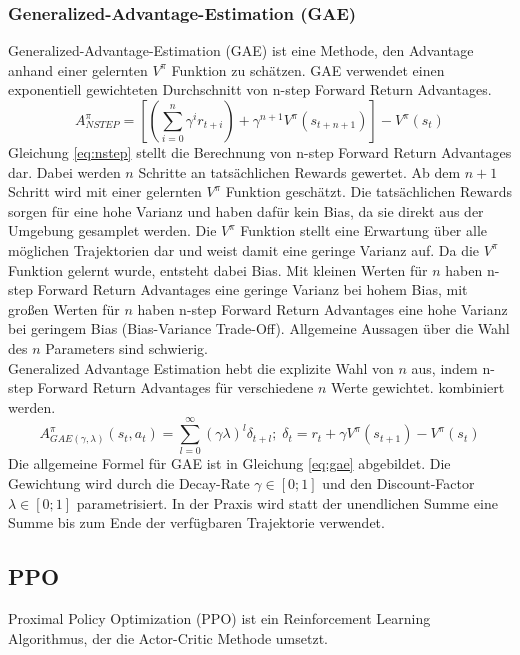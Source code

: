 \subsubsection{Generalized-Advantage-Estimation (GAE)}
Generalized-Advantage-Estimation (GAE) ist eine Methode, den Advantage anhand einer gelernten $V^\pi$ Funktion zu schätzen. GAE verwendet einen exponentiell gewichteten Durchschnitt von n-step Forward Return Advantages.
\begin{equation}
    A^\pi_{NSTEP} = \left[ (\sum_{i=0}^n \gamma^i r_{t+i}) + \gamma^{n+1} V^\pi (s_{t+n+1}) \right] - V^\pi(s_t)
    \label{eq:nstep}
\end{equation}
Gleichung \ref{eq:nstep} stellt die Berechnung von n-step Forward Return Advantages dar. Dabei werden $n$ Schritte an tatsächlichen Rewards gewertet. Ab dem $n+1$ Schritt wird mit einer gelernten $V^\pi$ Funktion geschätzt. Die tatsächlichen Rewards sorgen für eine hohe Varianz und haben dafür kein Bias, da sie direkt aus der Umgebung gesamplet werden. Die $V^\pi$ Funktion stellt eine Erwartung über alle möglichen Trajektorien dar und weist damit eine geringe Varianz auf. Da die $V^\pi$ Funktion gelernt wurde, entsteht dabei Bias. Mit kleinen Werten für $n$ haben n-step Forward Return Advantages eine geringe Varianz bei hohem Bias, mit großen Werten für $n$ haben n-step Forward Return Advantages eine hohe Varianz bei geringem Bias (Bias-Variance Trade-Off). Allgemeine Aussagen über die Wahl des $n$ Parameters sind schwierig.\\
Generalized Advantage Estimation hebt die explizite Wahl von $n$ aus, indem n-step Forward Return Advantages für verschiedene $n$ Werte gewichtet. kombiniert werden.
\begin{equation}
    A^\pi_{GAE(\gamma,\lambda)} (s_t,a_t) = \sum_{l=0}^\infty (\gamma\lambda)^l \delta_{t+l} ;\; \delta_t = r_t + \gamma V^\pi (s_{t+1}) - V^\pi(s_t)
    \label{eq:gae}
\end{equation}
Die allgemeine Formel für GAE ist in Gleichung \ref{eq:gae} abgebildet. Die Gewichtung wird durch die Decay-Rate $\gamma \in [0;1]$ und den Discount-Factor $\lambda \in [0;1]$ parametrisiert.
In der Praxis wird statt der unendlichen Summe eine Summe bis zum Ende der verfügbaren Trajektorie verwendet.


\subsection{PPO}
Proximal Policy Optimization (PPO) ist ein Reinforcement Learning Algorithmus, der die Actor-Critic Methode umsetzt.

